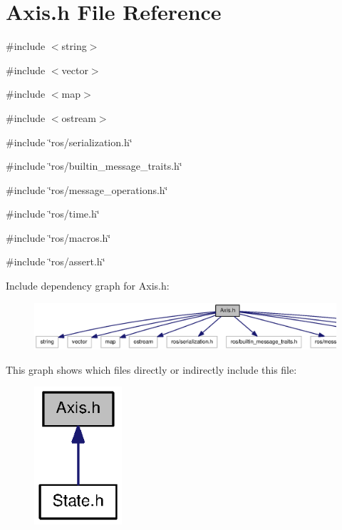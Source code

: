 \section{Axis.h File Reference}
\label{Axis_8h}
{\ttfamily \#include $<$string$>$}\par
{\ttfamily \#include $<$vector$>$}\par
{\ttfamily \#include $<$map$>$}\par
{\ttfamily \#include $<$ostream$>$}\par
{\ttfamily \#include \char`\"{}ros/serialization.h\char`\"{}}\par
{\ttfamily \#include \char`\"{}ros/builtin\_\-message\_\-traits.h\char`\"{}}\par
{\ttfamily \#include \char`\"{}ros/message\_\-operations.h\char`\"{}}\par
{\ttfamily \#include \char`\"{}ros/time.h\char`\"{}}\par
{\ttfamily \#include \char`\"{}ros/macros.h\char`\"{}}\par
{\ttfamily \#include \char`\"{}ros/assert.h\char`\"{}}\par
Include dependency graph for Axis.h:
\nopagebreak
\begin{figure}[H]
\begin{center}
\leavevmode
\includegraphics[width=400pt]{Axis_8h__incl}
\end{center}
\end{figure}
This graph shows which files directly or indirectly include this file:
\nopagebreak
\begin{figure}[H]
\begin{center}
\leavevmode
\includegraphics[width=92pt]{Axis_8h__dep__incl}
\end{center}
\end{figure}
